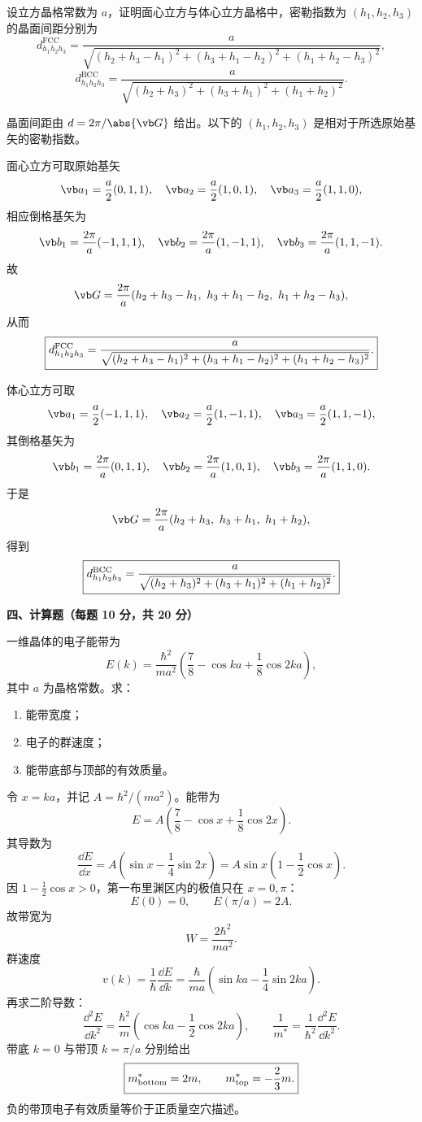 \begin{question}[10 分]
设立方晶格常数为 $a$，证明面心立方与体心立方晶格中，密勒指数为 $(h_1,h_2,h_3)$ 的晶面间距分别为
\[
 d_{h_1h_2h_3}^{\mathrm{FCC}}
 =\frac{a}{\sqrt{(h_2+h_3-h_1)^2+(h_3+h_1-h_2)^2+(h_1+h_2-h_3)^2}},
\]
\[
 d_{h_1h_2h_3}^{\mathrm{BCC}}
 =\frac{a}{\sqrt{(h_2+h_3)^2+(h_3+h_1)^2+(h_1+h_2)^2}}.
\]


\begin{solution}
晶面间距由 $d=2\pi/\abs{\vb G}$ 给出。以下的 $(h_1,h_2,h_3)$ 是相对于所选原始基矢的密勒指数。

面心立方可取原始基矢
\[
 \vb a_1=\frac a2(0,1,1),\quad
 \vb a_2=\frac a2(1,0,1),\quad
 \vb a_3=\frac a2(1,1,0),
\]
相应倒格基矢为
\[
 \vb b_1=\frac{2\pi}{a}(-1,1,1),\quad
 \vb b_2=\frac{2\pi}{a}(1,-1,1),\quad
 \vb b_3=\frac{2\pi}{a}(1,1,-1).
\]
故
\[
 \vb G=\frac{2\pi}{a}
 (h_2+h_3-h_1,\ h_3+h_1-h_2,\ h_1+h_2-h_3),
\]
从而
\[
 \boxed{d^{\rm FCC}_{h_1h_2h_3}=\frac{a}{\sqrt{(h_2+h_3-h_1)^2+(h_3+h_1-h_2)^2+(h_1+h_2-h_3)^2}}.}
\]

体心立方可取
\[
 \vb a_1=\frac a2(-1,1,1),\quad
 \vb a_2=\frac a2(1,-1,1),\quad
 \vb a_3=\frac a2(1,1,-1),
\]
其倒格基矢为
\[
 \vb b_1=\frac{2\pi}{a}(0,1,1),\quad
 \vb b_2=\frac{2\pi}{a}(1,0,1),\quad
 \vb b_3=\frac{2\pi}{a}(1,1,0).
\]
于是
\[
 \vb G=\frac{2\pi}{a}(h_2+h_3,\ h_3+h_1,\ h_1+h_2),
\]
得到
\[
 \boxed{d^{\rm BCC}_{h_1h_2h_3}=\frac{a}{\sqrt{(h_2+h_3)^2+(h_3+h_1)^2+(h_1+h_2)^2}}.}
\]
\end{solution}
\end{question}

\textbf{四、计算题（每题 10 分，共 20 分）}

\begin{question}[10 分]
一维晶体的电子能带为
\[
 E(k)=\frac{\hbar^2}{ma^2}\left(\frac78-\cos ka+\frac18\cos 2ka\right),
\]
其中 $a$ 为晶格常数。求：
\begin{enumerate}
  \item 能带宽度；
  \item 电子的群速度；
  \item 能带底部与顶部的有效质量。
\end{enumerate}


\begin{solution}
令 $x=ka$，并记 $A=\hbar^2/(ma^2)$。能带为
\[
 E=A\left(\frac78-\cos x+\frac18\cos2x\right).
\]
其导数为
\[
 \frac{\dd E}{\dd x}=A\left(\sin x-\frac14\sin2x\right)
 =A\sin x\left(1-\frac12\cos x\right).
\]
因 $1-\frac12\cos x>0$，第一布里渊区内的极值只在 $x=0,\pi$：
\[
 E(0)=0,\qquad E(\pi/a)=2A.
\]
故带宽为
\[
 \boxed{W=\frac{2\hbar^2}{ma^2}.}
\]
群速度
\[
 \boxed{v(k)=\frac1\hbar\frac{\dd E}{\dd k}
 =\frac{\hbar}{ma}\left(\sin ka-\frac14\sin2ka\right).}
\]
再求二阶导数：
\[
 \frac{\dd^2E}{\dd k^2}=\frac{\hbar^2}{m}
 \left(\cos ka-\frac12\cos2ka\right),
 \qquad
 \frac1{m^*}=\frac1{\hbar^2}\frac{\dd^2E}{\dd k^2}.
\]
带底 $k=0$ 与带顶 $k=\pi/a$ 分别给出
\[
 \boxed{m^*_{\rm bottom}=2m,\qquad
 m^*_{\rm top}=-\frac23m.}
\]
负的带顶电子有效质量等价于正质量空穴描述。
\end{solution}
\end{question}

